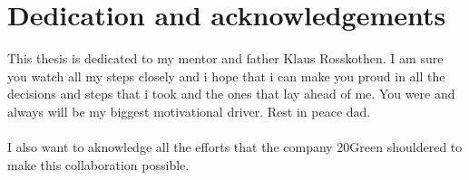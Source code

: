 
%

\chapter*{Dedication and acknowledgements}
%
This thesis is dedicated to my mentor and father Klaus Rosskothen. I am sure you watch all my steps closely and i hope that i can make you proud in all the decisions and steps that i took and the ones that lay ahead of me. You were and always will be my biggest motivational driver. Rest in peace dad.
\\\\
I also want to aknowledge all the efforts that the company 20Green shouldered to make this collaboration possible.

%
\clearpage